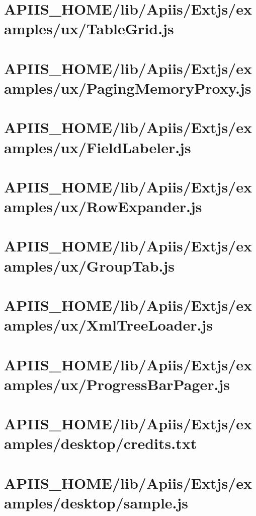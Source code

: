 \section{APIIS\_HOME/lib/Apiis/Extjs/examples/ux/TableGrid.js} 
\section{APIIS\_HOME/lib/Apiis/Extjs/examples/ux/PagingMemoryProxy.js} 
\section{APIIS\_HOME/lib/Apiis/Extjs/examples/ux/FieldLabeler.js} 
\section{APIIS\_HOME/lib/Apiis/Extjs/examples/ux/RowExpander.js} 
\section{APIIS\_HOME/lib/Apiis/Extjs/examples/ux/GroupTab.js} 
\section{APIIS\_HOME/lib/Apiis/Extjs/examples/ux/XmlTreeLoader.js} 
\section{APIIS\_HOME/lib/Apiis/Extjs/examples/ux/ProgressBarPager.js} 
\section{APIIS\_HOME/lib/Apiis/Extjs/examples/desktop/credits.txt} 
\section{APIIS\_HOME/lib/Apiis/Extjs/examples/desktop/sample.js} 
